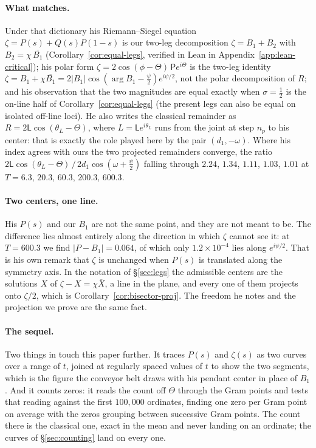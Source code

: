 \documentclass[11pt]{article}
\theoremstyle{definition}
\begin{document}
\paragraph{What matches.} Under that dictionary his Riemann--Siegel equation
$\zeta=P(s)+Q(s)P(1-s)$ is our two-leg decomposition $\zeta=B_1+B_2$ with
$B_2=\chi\,\overline{B_1}$ (Corollary~\ref{cor:equal-legs}, verified in Lean
in Appendix~\ref{app:lean-critical}); his polar form
$\zeta=2\cos(\phi-\Theta)\,\mathsf{P}e^{i\Theta}$ is the two-leg identity
$\zeta=B_1+\chi\overline{B_1}=2|B_1|\cos(\arg B_1-\tfrac{\psi}{2})e^{i\psi/2}$,
not the polar decomposition of $R$; and his observation that the
two magnitudes are equal exactly when $\sigma=\tfrac12$ is the on-line
half of Corollary~\ref{cor:equal-legs} (the present legs can also be equal
on isolated off-line loci). He also writes the classical remainder as
$R=2\mathsf{L}\cos(\theta_L-\Theta)$, where $L=\mathsf{L}e^{i\theta_L}$ runs
from the joint at step $n_p$ to his center: that is exactly the role played
here by the pair $(d_1,-\omega)$. Where his index agrees with ours the two
projected remainders converge, the ratio
$2\mathsf{L}\cos(\theta_L-\Theta)\,/\,2d_1\cos(\omega+\tfrac{\psi}{2})$
falling through $2.24$, $1.34$, $1.11$, $1.03$, $1.01$ at
$T=6.3,\,20.3,\,60.3,\,200.3,\,600.3$.

\paragraph{Two centers, one line.} His $P(s)$ and our $B_1$ are not the same
point, and they are not meant to be. The difference lies almost entirely
along the direction in which $\zeta$ cannot see it: at $T=600.3$ we find
$|P-B_1|=0.064$, of which only $1.2\times10^{-4}$ lies along $e^{i\psi/2}$.
That is his own remark that $\zeta$ is unchanged when $P(s)$ is translated
along the symmetry axis. In the notation of \S\ref{sec:legs} the
admissible centers are the solutions $X$ of $\zeta-X=\chi\overline{X}$, a
line in the plane, and every one of them projects onto $\zeta/2$, which is
Corollary~\ref{cor:bisector-proj}. The freedom he notes and the projection we
prove are the same fact.

\paragraph{The sequel.} Two things in \cite{Nickel2015} touch this paper
further. It traces $P(s)$ and $\zeta(s)$ as two curves over a range of $t$,
joined at regularly spaced values of $t$ to show the two segments, which is the
figure the conveyor belt draws with his
pendant center in place of $B_1$. And it counts zeros: it reads the count off
$\Theta$ through the Gram points and tests that reading against the first
$100{,}000$ ordinates, finding one zero per Gram point on average with the zeros
grouping between successive Gram points. The count there is the classical one,
exact in the mean and never landing on an ordinate; the curves of
\S\ref{sec:counting} land on every one.
\end{document}
